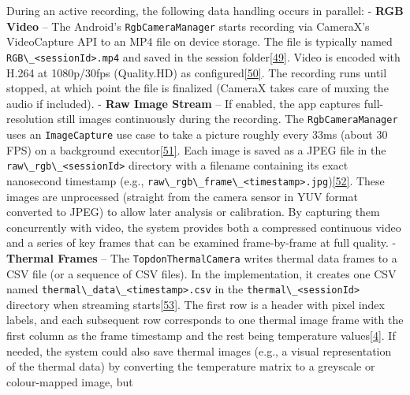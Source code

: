 \documentclass[12pt,a4paper]{article}
\begin{document}
During an active recording, the following data handling occurs in parallel: - \textbf{RGB Video} -- The Android's \passthrough{\lstinline!RgbCameraManager!} starts recording via CameraX's VideoCapture API to an MP4 file on device storage. The file is typically named \passthrough{\lstinline!RGB\_<sessionId>.mp4!} and saved in the session folder\href{https://github.com/buccancs/GSR-Dual-Video-System/blob/05ae360cb7b4ae7c7861f72deb235ad64a74b38e/android/app/src/main/java/com/yourcompany/gsrcapture/manager/SessionManager.kt\#L26-L34}{{[}49{]}}. Video is encoded with H.264 at 1080p/30fps (Quality.HD) as configured\href{https://github.com/buccancs/GSR-Dual-Video-System/blob/05ae360cb7b4ae7c7861f72deb235ad64a74b38e/android/app/src/main/java/com/yourcompany/gsrcapture/hardware/RgbCameraManager.kt\#L111-L119}{{[}50{]}}. The recording runs until stopped, at which point the file is finalized (CameraX takes care of muxing the audio if included). - \textbf{Raw Image Stream} -- If enabled, the app captures full-resolution still images continuously during the recording. The \passthrough{\lstinline!RgbCameraManager!} uses an \passthrough{\lstinline!ImageCapture!} use case to take a picture roughly every 33ms (about 30 FPS) on a background executor\href{https://github.com/buccancs/GSR-Dual-Video-System/blob/05ae360cb7b4ae7c7861f72deb235ad64a74b38e/android/app/src/main/java/com/yourcompany/gsrcapture/hardware/RgbCameraManager.kt\#L70-L78}{{[}51{]}}. Each image is saved as a JPEG file in the \passthrough{\lstinline!raw\_rgb\_<sessionId>!} directory with a filename containing its exact nanosecond timestamp (e.g., \passthrough{\lstinline!raw\_rgb\_frame\_<timestamp>.jpg!})\href{https://github.com/buccancs/GSR-Dual-Video-System/blob/05ae360cb7b4ae7c7861f72deb235ad64a74b38e/android/app/src/main/java/com/yourcompany/gsrcapture/hardware/RgbCameraManager.kt\#L86-L95}{{[}52{]}}. These images are unprocessed (straight from the camera sensor in YUV format converted to JPEG) to allow later analysis or calibration. By capturing them concurrently with video, the system provides both a compressed continuous video and a series of key frames that can be examined frame-by-frame at full quality. - \textbf{Thermal Frames} -- The \passthrough{\lstinline!TopdonThermalCamera!} writes thermal data frames to a CSV file (or a sequence of CSV files). In the implementation, it creates one CSV named \passthrough{\lstinline!thermal\_data\_<timestamp>.csv!} in the \passthrough{\lstinline!thermal\_<sessionId>!} directory when streaming starts\href{https://github.com/buccancs/GSR-Dual-Video-System/blob/05ae360cb7b4ae7c7861f72deb235ad64a74b38e/android/app/src/main/java/com/yourcompany/gsrcapture/hardware/TopdonThermalCamera.kt\#L50-L58}{{[}53{]}}. The first row is a header with pixel index labels, and each subsequent row corresponds to one thermal image frame with the first column as the frame timestamp and the rest being temperature values\href{https://github.com/buccancs/GSR-Dual-Video-System/blob/05ae360cb7b4ae7c7861f72deb235ad64a74b38e/android/app/src/main/java/com/yourcompany/gsrcapture/hardware/TopdonThermalCamera.kt\#L54-L62}{{[}4{]}}. If needed, the system could also save thermal images (e.g., a visual representation of the thermal data) by converting the temperature matrix to a greyscale or colour-mapped image, but 
\end{document}
